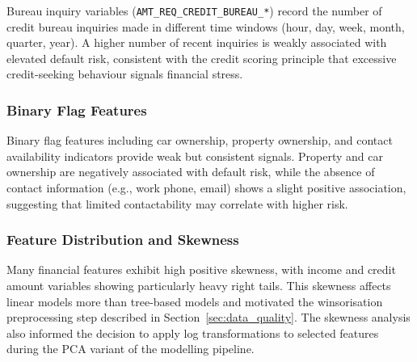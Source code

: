 Bureau inquiry variables (\texttt{AMT\_REQ\_CREDIT\_BUREAU\_*}) record the number of credit bureau inquiries made in different time windows (hour, day, week, month, quarter, year). A higher number of recent inquiries is weakly associated with elevated default risk, consistent with the credit scoring principle that excessive credit-seeking behaviour signals financial stress.

\subsubsection{Binary Flag Features}



Binary flag features including car ownership, property ownership, and contact availability indicators provide weak but consistent signals. Property and car ownership are negatively associated with default risk, while the absence of contact information (e.g., work phone, email) shows a slight positive association, suggesting that limited contactability may correlate with higher risk.

\subsubsection{Feature Distribution and Skewness}



Many financial features exhibit high positive skewness, with income and credit amount variables showing particularly heavy right tails. This skewness affects linear models more than tree-based models and motivated the winsorisation preprocessing step described in Section~\ref{sec:data_quality}. The skewness analysis also informed the decision to apply log transformations to selected features during the PCA variant of the modelling pipeline.

